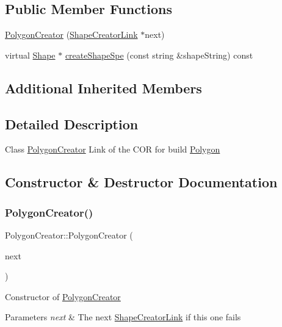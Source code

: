 \subsection*{Public Member Functions}
\begin{DoxyCompactItemize}
\item 
\hyperlink{class_polygon_creator_ab0d3a2c045b483938bda8cffc6173e42}{Polygon\+Creator} (\hyperlink{class_shape_creator_link}{Shape\+Creator\+Link} $\ast$next)
\item 
virtual \hyperlink{class_shape}{Shape} $\ast$ \hyperlink{class_polygon_creator_ad7a34580d4291a50fe189c912c7b32a0}{create\+Shape\+Spe} (const string \&shape\+String) const
\end{DoxyCompactItemize}
\subsection*{Additional Inherited Members}


\subsection{Detailed Description}
Class \hyperlink{class_polygon_creator}{Polygon\+Creator} Link of the C\+OR for build \hyperlink{class_polygon}{Polygon} 

\subsection{Constructor \& Destructor Documentation}
\hypertarget{class_polygon_creator_ab0d3a2c045b483938bda8cffc6173e42}{}\label{class_polygon_creator_ab0d3a2c045b483938bda8cffc6173e42} 
\subsubsection{\texorpdfstring{Polygon\+Creator()}{PolygonCreator()}}
{\footnotesize\ttfamily Polygon\+Creator\+::\+Polygon\+Creator (\begin{DoxyParamCaption}\item[{\hyperlink{class_shape_creator_link}{Shape\+Creator\+Link} $\ast$}]{next }\end{DoxyParamCaption})}

Constructor of \hyperlink{class_polygon_creator}{Polygon\+Creator} 
\begin{DoxyParams}{Parameters}
{\em next} & The next \hyperlink{class_shape_creator_link}{Shape\+Creator\+Link} if this one fails \\
\hline
\end{DoxyParams}


